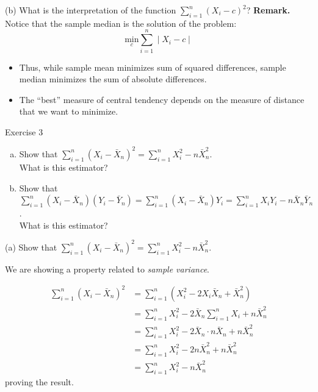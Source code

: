 \documentclass[
  11pt,
  ignorenonframetext,
]{beamer}
\providecommand{\tightlist}{%
  \setlength{\itemsep}{0pt}\setlength{\parskip}{0pt}}
\begin{document}
\begin{frame}{(b) What is the interpretation of the function
\(\sum_{i=1}^{n} \left(X_i - c\right)^2\)?}
\protect\hypertarget{b-what-is-the-interpretation-of-the-function-sum_i1n-leftx_i---cright2-1}{}
\textbf{Remark.} Notice that the sample median is the solution of the
problem: \[
\tag{2}
\underset{c}{\text{min}} \sum_{i=1}^{n} \mid X_i - c\mid
\]

\begin{itemize}
\tightlist
\item
  Thus, while sample mean minimizes sum of squared differences, sample
  median minimizes the sum of absolute differences.
\item
  The ``best'' measure of central tendency depends on the measure of
  distance that we want to minimize.
\end{itemize}
\end{frame}

\begin{frame}{Exercise 3}
\protect\hypertarget{exercise-3}{}
\begin{enumerate}
[a.]
\tightlist
\item
  Show that
  \(\sum_{i=1}^n \left(X_i - \bar{X}_n\right)^2 = \sum_{i=1}^n X_i^2 - n \bar{X}_n^2\).\\
  What is this estimator?
\end{enumerate}

\vspace{3mm}

\begin{enumerate}
[a.]
\setcounter{enumi}{1}
\tightlist
\item
  Show that
  \(\sum_{i=1}^n \left(X_i - \bar{X}_n\right)\left(Y_i - \bar{Y}_n\right) = \sum_{i=1}^n \left(X_i - \bar{X}_n\right)Y_i = \sum_{i=1}^n X_i Y_i - n\bar{X}_n\bar{Y}_n\).\\
  What is this estimator?
\end{enumerate}
\end{frame}

\begin{frame}{(a) Show that
\(\sum_{i=1}^n \left(X_i - \bar{X}_n\right)^2 = \sum_{i=1}^n X_i^2 - n \bar{X}_n^2\).}
\protect\hypertarget{a-show-that-sum_i1n-leftx_i---barx_nright2-sum_i1n-x_i2---n-barx_n2.}{}
\pause

We are showing a property related to \emph{sample variance}.

\pause

\[
\begin{aligned}
\sum_{i=1}^n \left(X_i - \bar{X}_n\right)^2  &= \sum_{i=1}^n \left(X_i^2 - 2X_i\bar{X}_n + \bar{X}_n^2\right)\\
&= \sum_{i=1}^n X_i^2  - 2 \bar{X}_n \sum_{i=1}^n X_i + n \bar{X}_n^2\\
&= \sum_{i=1}^n X_i^2  - 2 \bar{X}_n \cdot n \bar{X}_n + n \bar{X}_n^2\\
&= \sum_{i=1}^n X_i^2  - 2n \bar{X}_n^2 + n \bar{X}_n^2\\
&= \sum_{i=1}^n X_i^2 - n \bar{X}_n^2
\end{aligned}
\] proving the result.
\end{frame}
\end{document}
